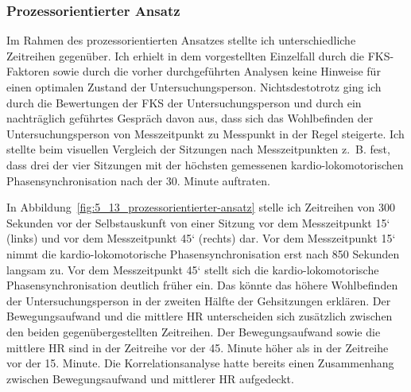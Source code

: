 \subsubsection{Prozessorientierter Ansatz}

\begin{sidewaysfigure}
	\resizebox{1.00\textwidth}{!}{%
		
		}%
	\caption[Prozessdarstellung im Verlauf des Gehens (Fallstudie: Gehen)]{Prozessdarstellung im Verlauf des Gehens -- Drei Minuten Daten aus einem Gang vor der 15 Minute (links) und einem Gang vor der 45 Minute (rechts). Quelle: Eigene Darstellung \\ \hspace{\textwidth}\emph{Anmerkung}: Bew. = Bewegungsaufwand \\ \hspace{\textwidth}Rel. Phase = Relative Phase}
	\label{fig:5_13_prozessorientierter-ansatz}
\end{sidewaysfigure}

Im Rahmen des prozessorientierten Ansatzes stellte ich unterschiedliche Zeitreihen gegenüber. Ich erhielt in dem vorgestellten Einzelfall durch die \ac{FKS}-Faktoren sowie durch die vorher durchgeführten Analysen keine Hinweise für einen optimalen Zustand der Untersuchungsperson. Nichtsdestotrotz ging ich durch die Bewertungen der \ac{FKS} der Untersuchungsperson und durch ein nachträglich geführtes Gespräch davon aus, dass sich das Wohlbefinden der Untersuchungsperson von Messzeitpunkt zu Messpunkt in der Regel steigerte. Ich stellte beim visuellen Vergleich der Sitzungen nach Messzeitpunkten z.~B. fest, dass drei der vier Sitzungen mit der höchsten gemessenen kardio-lokomotorischen Phasensynchronisation nach der 30. Minute auftraten.

In Abbildung~\ref{fig:5_13_prozessorientierter-ansatz} stelle ich Zeitreihen von 300 Sekunden vor der Selbstauskunft von einer Sitzung vor dem Messzeitpunkt 15‘ (links) und vor dem Messzeitpunkt 45‘ (rechts) dar. Vor dem Messzeitpunkt 15‘ nimmt die kardio-lokomotorische Phasensynchronisation erst nach 850 Sekunden langsam zu. Vor dem Messzeitpunkt 45‘ stellt sich die kardio-lokomotorische Phasensynchronisation deutlich früher ein. Das könnte das höhere Wohlbefinden der Untersuchungsperson in der zweiten Hälfte der Gehsitzungen erklären. Der Bewegungsaufwand und die mittlere \ac{HR} unterscheiden sich zusätzlich zwischen den beiden gegenübergestellten Zeitreihen. Der Bewegungsaufwand sowie die mittlere \ac{HR} sind in der Zeitreihe vor der 45. Minute höher als in der Zeitreihe vor der 15. Minute. Die Korrelationsanalyse hatte bereits einen Zusammenhang zwischen Bewegungsaufwand und mittlerer \ac{HR} aufgedeckt.


